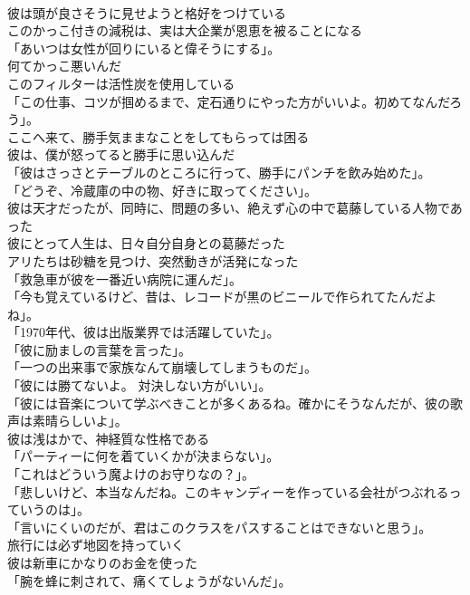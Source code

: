 \documentclass[8pt]{extreport}
\begin{document}
\begin{CJK}{UTF8}{min}
\\	彼は頭が良さそうに見せようと格好をつけている	
\\	このかっこ付きの減税は、実は大企業が恩恵を被ることになる	
\\	「あいつは女性が回りにいると偉そうにする」。	
\\	何てかっこ悪いんだ	
\\	このフィルターは活性炭を使用している	
\\	「この仕事、コツが掴めるまで、定石通りにやった方がいいよ。初めてなんだろう」。	
\\	ここへ来て、勝手気ままなことをしてもらっては困る	
\\	彼は、僕が怒ってると勝手に思い込んだ	
\\	「彼はさっさとテーブルのところに行って、勝手にパンチを飲み始めた」。	
\\	「どうぞ、冷蔵庫の中の物、好きに取ってください」。	
\\	彼は天才だったが、同時に、問題の多い、絶えず心の中で葛藤している人物であった	
\\	彼にとって人生は、日々自分自身との葛藤だった	
\\	アリたちは砂糖を見つけ、突然動きが活発になった	
\\	「救急車が彼を一番近い病院に運んだ」。	
\\	「今も覚えているけど、昔は、レコードが黒のビニールで作られてたんだよね」。	
\\	「1970年代、彼は出版業界では活躍していた」。	
\\	「彼に励ましの言葉を言った」。	
\\	「一つの出来事で家族なんて崩壊してしまうものだ」。	
\\	「彼には勝てないよ。 対決しない方がいい」。	
\\	「彼には音楽について学ぶべきことが多くあるね。確かにそうなんだが、彼の歌声は素晴らしいよ」。	
\\	彼は浅はかで、神経質な性格である	
\\	「パーティーに何を着ていくかが決まらない」。	
\\	「これはどういう魔よけのお守りなの？」。	
\\	「悲しいけど、本当なんだね。このキャンディーを作っている会社がつぶれるっていうのは」。	
\\	「言いにくいのだが、君はこのクラスをパスすることはできないと思う」。	
\\	旅行には必ず地図を持っていく	
\\	彼は新車にかなりのお金を使った	
\\	「腕を蜂に刺されて、痛くてしょうがないんだ」。	

\end{CJK}
\end{document}
